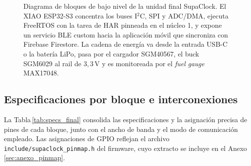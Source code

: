 \documentclass[letterpaper,11pt]{article}
\newcommand{\rtabla}[1]{Tabla\,\ref{#1}}
\begin{document}
\begin{figure}[H]
    \centering
    \resizebox{0.95\textwidth}{!}{}
    \caption[Diagrama de bloques de bajo nivel de la unidad final]{Diagrama de bloques de bajo nivel de la unidad final SupaClock. El XIAO ESP32-S3 concentra los buses I$^2$C, SPI y ADC/DMA, ejecuta FreeRTOS con la tarea de HAR pinneada en el n\'ucleo 1, y expone un servicio BLE custom hacia la aplicaci\'on m\'ovil que sincroniza con Firebase Firestore. La cadena de energ\'ia va desde la entrada USB-C o la bater\'ia LiPo, pasa por el cargador SGM40567, el buck SGM6029 al rail de $3{,}3$\,V y es monitoreada por el \textit{fuel gauge} MAX17048.}
    \label{fig:lownivel_final}
\end{figure}

\subsection{Especificaciones por bloque e interconexiones}

La \rtabla{tab:specs_final} consolida las especificaciones y la asignaci\'on precisa de pines de cada bloque, junto con el ancho de banda y el modo de comunicaci\'on empleado. Las asignaciones de GPIO reflejan el archivo \texttt{include/supaclock\_pinmap.h} del firmware, cuyo extracto se incluye en el Anexo \ref{sec:anexo_pinmap}.
\end{document}
